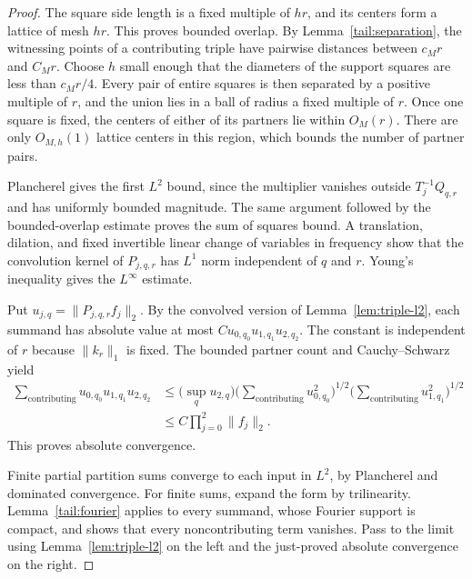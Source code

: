 \documentclass[11pt]{amsart}
\theoremstyle{definition}
\theoremstyle{remark}
\numberwithin{equation}{section}
\begin{document}
\begin{proof}
The square side length is a fixed multiple of $hr$, and its centers
form a lattice of mesh $hr$. This proves bounded overlap. By
Lemma~\ref{tail:separation}, the witnessing points of a contributing
triple have pairwise distances between $c_Mr$ and $C_Mr$. Choose $h$
small enough that the diameters of the support squares are less than
$c_Mr/4$. Every pair of entire squares is then separated by a positive
multiple of $r$, and the union lies in a ball of radius a fixed multiple
of $r$. Once one square is fixed, the centers of either of its partners
lie within $O_M(r)$. There are only $O_{M,h}(1)$ lattice centers in this
region, which bounds the number of partner pairs.

Plancherel gives the first $L^2$ bound, since the multiplier vanishes
outside $T_j^{-1}Q_{q,r}$ and has uniformly bounded magnitude. The same
argument followed by the bounded-overlap estimate proves the sum of
squares bound. A translation, dilation, and fixed invertible linear
change of variables in frequency show that the convolution kernel of
$P_{j,q,r}$ has $L^1$ norm independent of $q$ and $r$. Young's inequality
gives the $L^\infty$ estimate.

Put $u_{j,q}=\|P_{j,q,r}f_j\|_2$. By the convolved version of
Lemma~\ref{lem:triple-l2}, each summand has absolute value at most
$C u_{0,q_0}u_{1,q_1}u_{2,q_2}$. The constant is independent of $r$
because $\|k_r\|_1$ is fixed. The bounded partner count and
Cauchy--Schwarz yield
\begin{align*}
 \sum_{\mathrm{contributing}}u_{0,q_0}u_{1,q_1}u_{2,q_2}
 &\le \Big(\sup_q u_{2,q}\Big)
      \Big(\sum_{\mathrm{contributing}}u_{0,q_0}^2\Big)^{1/2}
      \Big(\sum_{\mathrm{contributing}}u_{1,q_1}^2\Big)^{1/2}\\
 &\le C\prod_{j=0}^2\|f_j\|_2.
\end{align*}
This proves absolute convergence.

Finite partial partition sums converge to each input in $L^2$, by
Plancherel and dominated convergence. For finite sums, expand the form
by trilinearity. Lemma~\ref{tail:fourier} applies to every summand,
whose Fourier support is compact, and shows that every noncontributing
term vanishes. Pass to the limit using Lemma~\ref{lem:triple-l2} on
the left and the just-proved absolute convergence on the right.
\end{proof}
\end{document}

